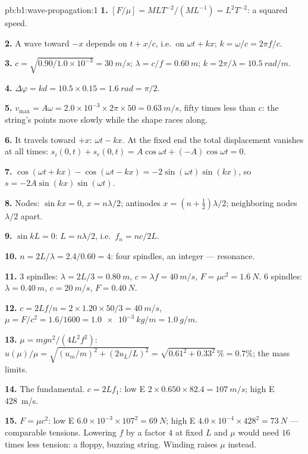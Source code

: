 \begin{solution}{pb:b1:wave-propagation:1}
\textbf{1.} $[F/\mu] = M L T^{-2}/(M L^{-1}) = L^2 T^{-2}$: a squared
speed.

\textbf{2.} A wave toward $-x$ depends on $t + x/c$, i.e.\ on
$\omega t + kx$; $k = \omega/c = 2\pi f/c$.

\textbf{3.} $c = \sqrt{0.90/1.0\times10^{-3}} = \qty{30}{m/s}$;
$\lambda = c/f = \qty{0.60}{m}$; $k = 2\pi/\lambda = \qty{10.5}{rad/m}$.

\textbf{4.} $\Delta\varphi = kd = 10.5 \times 0.15 = \qty{1.6}{rad} = \pi/2$.

\textbf{5.} $v_{\max} = A\omega = 2.0\times10^{-3} \times 2\pi \times 50 =
\qty{0.63}{m/s}$, fifty times less than $c$: the string's points move
slowly while the shape races along.

\textbf{6.} It travels toward $+x$:  $\omega t - kx$. At the fixed
end the total displacement vanishes at all times: $s_i(0, t) + s_r(0, t)
= A\cos\omega t + (-A)\cos\omega t = 0$.

\textbf{7.} $\cos(\omega t + kx) - \cos(\omega t - kx) =
-2\sin(\omega t)\sin(kx)$, so $s = -2A\sin(kx)\sin(\omega t)$.

\textbf{8.} Nodes: $\sin kx = 0$, $x = n\lambda/2$; antinodes $x = (n +
\tfrac12)\lambda/2$; neighboring nodes $\lambda/2$ apart.

\textbf{9.} $\sin kL = 0$: $L = n\lambda/2$, i.e.\ $f_n = nc/2L$.

\textbf{10.} $n = 2L/\lambda = 2.4/0.60 = 4$: four spindles, an integer
--- resonance.

\textbf{11.} $3$ spindles: $\lambda = 2L/3 = \qty{0.80}{m}$, $c = \lambda f
= \qty{40}{m/s}$, $F = \mu c^2 = \qty{1.6}{N}$. $6$ spindles: $\lambda =
\qty{0.40}{m}$, $c = \qty{20}{m/s}$, $F = \qty{0.40}{N}$.

\textbf{12.} $c = 2Lf/n = 2 \times 1.20 \times 50/3 = \qty{40}{m/s}$,
$\mu = F/c^2 = 1.6/1600 = \qty{1.0e-3}{kg/m} = \qty{1.0}{g/m}$.

\textbf{13.} $\mu = mgn^2/(4L^2f^2)$: $u(\mu)/\mu = \sqrt{(u_m/m)^2 +
(2u_L/L)^2} = \sqrt{0.61^2 + 0.33^2}\,\% = 0.7\%$; the mass limits.

\textbf{14.} The fundamental. $c = 2Lf_1$: low E $2 \times 0.650 \times
82.4 = \qty{107}{m/s}$; high E \qty{428}{m/s}.

\textbf{15.} $F = \mu c^2$: low E $6.0\times10^{-3} \times 107^2 =
\qty{69}{N}$; high E $4.0\times10^{-4} \times 428^2 = \qty{73}{N}$ ---
comparable tensions. Lowering $f$ by a factor $4$ at fixed $L$ and $\mu$
would need $16$ times less tension: a floppy, buzzing string. Winding
raises $\mu$ instead.


\end{solution}
